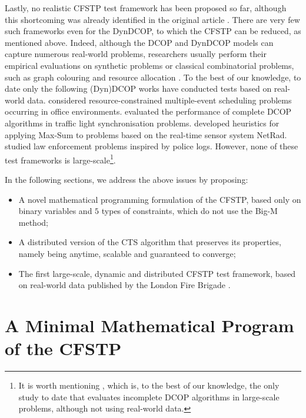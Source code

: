 Lastly, no realistic CFSTP test framework has been proposed so far, although this
shortcoming was already identified in the original article \cite[Section
$8$]{ramchurn2010cfstp}. There are very few such frameworks even for the DynDCOP, to which
the CFSTP can be reduced, as mentioned above. Indeed, although the DCOP and DynDCOP models
can capture numerous real-world problems, researchers usually perform their empirical
evaluations on synthetic problems or classical combinatorial problems, such as graph
colouring and resource allocation \cite{fioretto2018survey}. To the best of our knowledge,
to date only the following (Dyn)DCOP works have conducted tests based on real-world data.
\cite{maheswaran2004b} considered resource-constrained multiple-event scheduling problems
occurring in office environments. \cite{junges2008} evaluated the performance of complete
DCOP algorithms in traffic light synchronisation problems. \cite{kim2011} developed
heuristics for applying Max-Sum to problems based on the real-time sensor system NetRad.
\cite{nelke2020,tkach2021} studied law enforcement problems inspired by police logs.
However, none of these test frameworks is large-scale\footnote{It is worth mentioning
\cite{leite2019a}, which is, to the best of our knowledge, the only study to date that
evaluates incomplete DCOP algorithms in large-scale problems, although not using
real-world data.}.

In the following sections, we address the above issues by proposing:
\begin{itemize}
    \item A novel mathematical programming formulation of the CFSTP, based only on binary
        variables and $5$ types of constraints, which do not use the Big-M method;
    \item A distributed version of the CTS algorithm that preserves its properties, namely
        being anytime, scalable and guaranteed to converge;
    \item The first large-scale, dynamic and distributed CFSTP test framework, based on
        real-world data published by the London Fire Brigade
        \cite{lfb-incident,lfb-mobilisation}.
\end{itemize}

\section{A Minimal Mathematical Program of the CFSTP}\label{sec:cfstp-bip}

